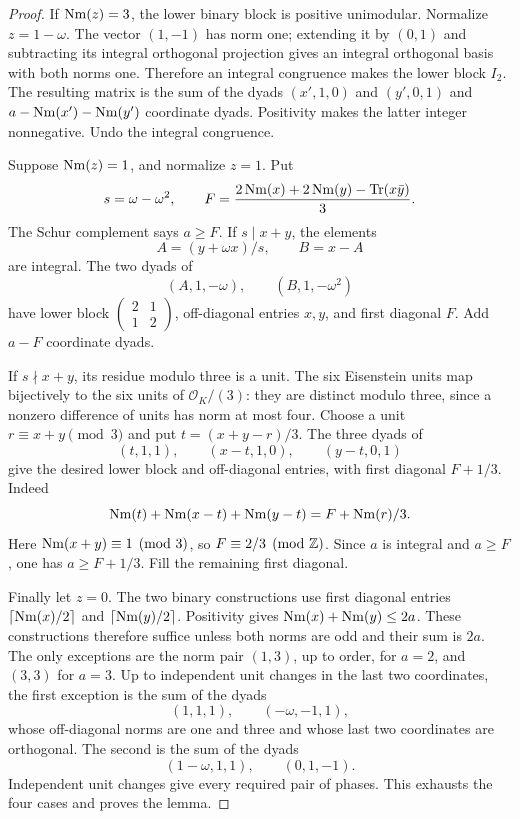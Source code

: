 \begin{proof}
If $\operatorname{Nm}(z)=3$, the lower binary block is positive unimodular. Normalize $z=1-\omega$. The vector $(1,-1)$ has norm one; extending it by $(0,1)$ and subtracting its integral orthogonal projection gives an integral orthogonal basis with both norms one. Therefore an integral congruence makes the lower block $I_2$. The resulting matrix is the sum of the dyads $(x',1,0)$ and $(y',0,1)$ and $a-\operatorname{Nm}(x')-\operatorname{Nm}(y')$ coordinate dyads. Positivity makes the latter integer nonnegative. Undo the integral congruence.

Suppose $\operatorname{Nm}(z)=1$, and normalize $z=1$. Put
\[
s=\omega-\omega^2,\qquad
F=\frac{2\operatorname{Nm}(x)+2\operatorname{Nm}(y)-\operatorname{Tr}(x\bar y)}3.
\]
The Schur complement says $a\geq F$. If $s\mid x+y$, the elements
\[
A=(y+\omega x)/s,\qquad B=x-A
\]
are integral. The two dyads of
\[
(A,1,-\omega),\qquad(B,1,-\omega^2)
\]
have lower block $\left(\begin{smallmatrix}2&1\\1&2\end{smallmatrix}\right)$, off-diagonal entries $x,y$, and first diagonal $F$. Add $a-F$ coordinate dyads.

If $s\nmid x+y$, its residue modulo three is a unit. The six Eisenstein units map bijectively to the six units of $\mathcal O_K/(3)$: they are distinct modulo three, since a nonzero difference of units has norm at most four. Choose a unit $r\equiv x+y\pmod3$ and put $t=(x+y-r)/3$. The three dyads of
\[
(t,1,1),\qquad(x-t,1,0),\qquad(y-t,0,1)
\]
give the desired lower block and off-diagonal entries, with first diagonal $F+1/3$. Indeed
\[
\operatorname{Nm}(t)+\operatorname{Nm}(x-t)+\operatorname{Nm}(y-t)=F+\operatorname{Nm}(r)/3.
\]
Here $\operatorname{Nm}(x+y)\equiv1\pmod3$, so $F\equiv2/3\pmod{\mathbb Z}$. Since $a$ is integral and $a\geq F$, one has $a\geq F+1/3$. Fill the remaining first diagonal.

Finally let $z=0$. The two binary constructions use first diagonal entries $\lceil\operatorname{Nm}(x)/2\rceil$ and $\lceil\operatorname{Nm}(y)/2\rceil$. Positivity gives $\operatorname{Nm}(x)+\operatorname{Nm}(y)\leq2a$. These constructions therefore suffice unless both norms are odd and their sum is $2a$. The only exceptions are the norm pair $(1,3)$, up to order, for $a=2$, and $(3,3)$ for $a=3$. Up to independent unit changes in the last two coordinates, the first exception is the sum of the dyads
\[
(1,1,1),\qquad(-\omega,-1,1),
\]
whose off-diagonal norms are one and three and whose last two coordinates are orthogonal. The second is the sum of the dyads
\[
(1-\omega,1,1),\qquad(0,1,-1).
\]
Independent unit changes give every required pair of phases. This exhausts the four cases and proves the lemma.
\end{proof}

